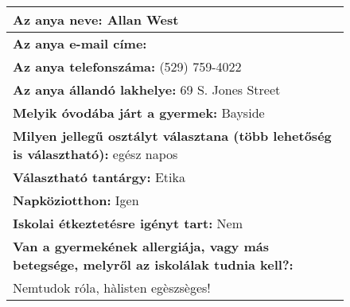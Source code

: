 \documentclass[10pt,a4paper]{article}
\begin{document}
\begin{figure}[!ht]
\begin{tabular}{|m{\textwidth}|}
\hline\vspace{3pt}
\textbf{Az anya neve:} \hspace{0.5cm} Allan West \vspace{3pt} \\
\hline\vspace{3pt}
\textbf{Az anya e-mail címe:} \hspace{0.5cm}   \vspace{3pt} \\
\hline\vspace{3pt}
\textbf{Az anya telefonszáma:} \hspace{0.5cm} (529) 759-4022 \vspace{3pt} \\
\hline\vspace{3pt}
\textbf{Az anya állandó lakhelye:} \hspace{0.5cm} 69 S. Jones Street \vspace{3pt} \\
\hline\vspace{3pt}
\textbf{Melyik óvodába járt a gyermek:} \hspace{0.5cm} Bayside \vspace{3pt} \\
\hline\vspace{3pt}
\textbf{Milyen jellegű osztályt választana (több lehetőség is választható):} \hspace{0.5cm} egész napos \vspace{3pt} \\
\hline\vspace{3pt}
\textbf{Választható tantárgy:} \hspace{0.5cm} Etika \vspace{3pt} \\
\hline\vspace{3pt}
\textbf{Napköziotthon:} \hspace{0.5cm} Igen \vspace{3pt} \\
\hline\vspace{3pt}
\textbf{Iskolai étkeztetésre igényt tart:} \hspace{0.5cm} Nem \vspace{3pt} \\
\hline\vspace{3pt}
\textbf{Van a gyermekének allergiája, vagy más betegsége, melyről az iskolálak tudnia kell?:} \\ \hspace{0.5cm} Nemtudok róla, hàlisten egèszsèges! \vspace{3pt} \\

\end{tabular}
\end{figure}
\end{document}
